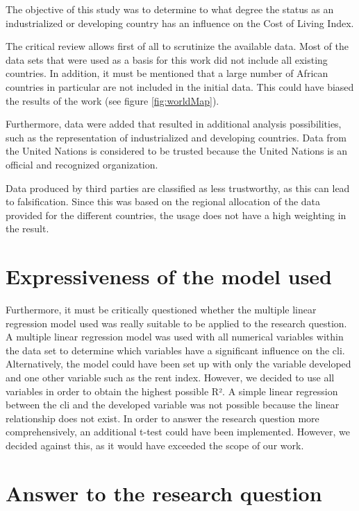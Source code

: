 \documentclass[
  11pt,
  a4paper,
  twoside]{scrbook}
\begin{document}
The objective of this study was to determine to what degree the status as an industrialized or developing country has an influence on the Cost of Living Index.

The critical review allows first of all to scrutinize the available data. Most of the data sets that were used as a basis for this work did not include all existing countries. In addition, it must be mentioned that a large number of African countries in particular are not included in the initial data. This could have biased the results of the work (see figure \ref{fig:worldMap}).

Furthermore, data were added that resulted in additional analysis possibilities, such as the representation of industrialized and developing countries. Data from the United Nations is considered to be trusted because the United Nations is an official and recognized organization.

Data produced by third parties are classified as less trustworthy, as this can lead to falsification. Since this was based on the regional allocation of the data provided for the different countries, the usage does not have a high weighting in the result.

\hypertarget{expressiveness-of-the-model-used}{%
\section{Expressiveness of the model used}\label{expressiveness-of-the-model-used}}

Furthermore, it must be critically questioned whether the multiple linear regression model used was really suitable to be applied to the research question. A multiple linear regression model was used with all numerical variables within the data set to determine which variables have a significant influence on the cli. Alternatively, the model could have been set up with only the variable developed and one other variable such as the rent index. However, we decided to use all variables in order to obtain the highest possible R². A simple linear regression between the cli and the developed variable was not possible because the linear relationship does not exist.
In order to answer the research question more comprehensively, an additional t-test could have been implemented. However, we decided against this, as it would have exceeded the scope of our work.

\hypertarget{answer-to-the-research-question}{%
\section{Answer to the research question}\label{answer-to-the-research-question}}
\end{document}
